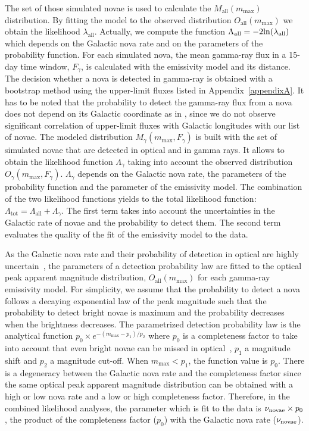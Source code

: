 \documentclass{aa} %
\newcommand{\tot}{\textrm{tot} }
\begin{document}
The set of those simulated novae is used to calculate the $M_{\textrm{all}}(m_{\textrm{max}})$ distribution. By fitting the model to the observed distribution $O_{\textrm{all}}(m_{\textrm{max}})$ we obtain the likelihood $\lambda_{\textrm{all}}$. Actually, we compute the function $\Lambda_{\textrm{all}} = -2 {\rm ln}(\lambda_{\textrm{all}})$ which depends on the Galactic nova rate and on the parameters of the probability function.
For each simulated nova, the mean gamma-ray flux in a 15-day time window, $F_{\gamma}$, is calculated with the emissivity model and its distance. The decision whether a nova is detected in gamma-ray is obtained with a bootstrap method using the upper-limit fluxes listed in Appendix~\ref{appendixA}. It has to be noted that the probability to detect the gamma-ray flux from a nova does not depend on its Galactic coordinate as in \citet{2017MNRAS.465.1218M}, since we do not observe significant correlation of upper-limit fluxes with Galactic longitudes with our list of novae. 
The modeled distribution $M_{\gamma}(m_{\textrm{max}}, F_{\gamma})$ is built with the set of simulated novae that are detected in optical and in gamma rays. It allows to obtain the likelihood function $\Lambda_{\gamma}$ taking into account the observed distribution $O_{\gamma}(m_{\textrm{max}}, F_{\gamma})$. $\Lambda_{\gamma}$ depends on the Galactic nova rate, the parameters of the probability function and the parameter of the emissivity model. The combination of the two likelihood functions yields to the total likelihood function: $\Lambda_{\tot} = \Lambda_{\textrm{all}} +\Lambda_{\gamma}$. The first term takes into account the uncertainties in the Galactic rate of novae and the probability to detect them. The second term evaluates the quality of the fit of the emissivity model to the data.

As the Galactic nova rate and their probability of detection in optical are highly uncertain~\citep[e.g. see][]{2017ApJ...834..196S}, the parameters of a detection probability law are fitted to the optical peak apparent magnitude distribution, $O_{\textrm{all}}(m_{\textrm{max}})$ for each gamma-ray emissivity model. For simplicity, we assume that the probability to detect a nova follows a decaying exponential law of the peak magnitude such that the probability to detect bright novae is maximum and the probability decreases when the brightness decreases. The parametrized detection probability law is the analytical function $p_0 \times e^{-(m_{\textrm{max}} - p_1)/p_2}$ where $p_0$ is a completeness factor to take into account that even bright novae can be missed in optical~\citep[see][]{2017ApJ...834..196S}, $p_1$ a magnitude shift and $p_2$ a magnitude cut-off. When $m_{\textrm{max}} < p_1$, the function value is $p_0$. There is a degeneracy between the Galactic nova rate and the completeness factor since the same optical peak apparent magnitude distribution can be obtained with a high or low nova rate and a low or high completeness factor. Therefore, in the combined likelihood analyses, the parameter which is fit to the data is $\nu_{\rm novae} \times p_0$, 
the product of the completeness factor ($p_0$) with the Galactic nova rate ($\nu_{\rm novae}$).
\end{document}
